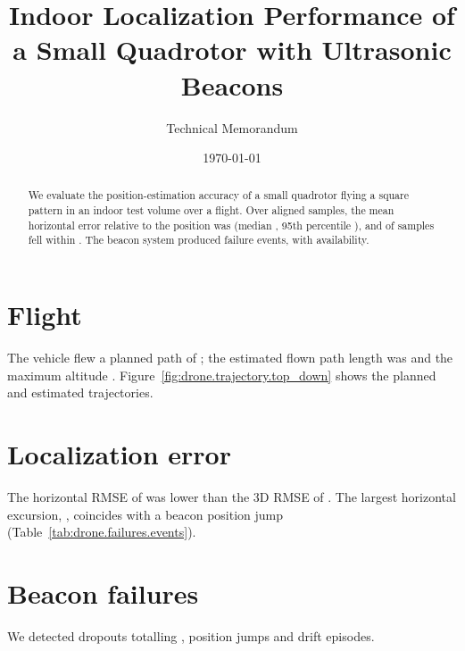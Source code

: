 \documentclass[11pt]{article}
\title{Indoor Localization Performance of a Small Quadrotor with Ultrasonic Beacons}
\author{Technical Memorandum}
\date{\today}
\begin{document}
\maketitle

\begin{abstract}
We evaluate the position-estimation accuracy of a small quadrotor flying a square pattern
in an indoor test volume over a  flight. Over
 aligned samples, the mean horizontal error relative to the
 position was  (median
, 95th percentile ), and
 of samples fell within . The beacon system produced
 failure events, with 
availability.
\end{abstract}

\section{Flight}
The vehicle flew a planned path of ; the estimated
flown path length was  and the maximum altitude
. Figure~\ref{fig:drone.trajectory.top_down} shows the
planned and estimated trajectories.


\section{Localization error}
The horizontal RMSE of  was lower than the 3D RMSE of
. The largest horizontal excursion, ,
coincides with a beacon position jump (Table~\ref{tab:drone.failures.events}).


\section{Beacon failures}
We detected  dropouts totalling
,  position jumps and
 drift episodes.

\end{document}

